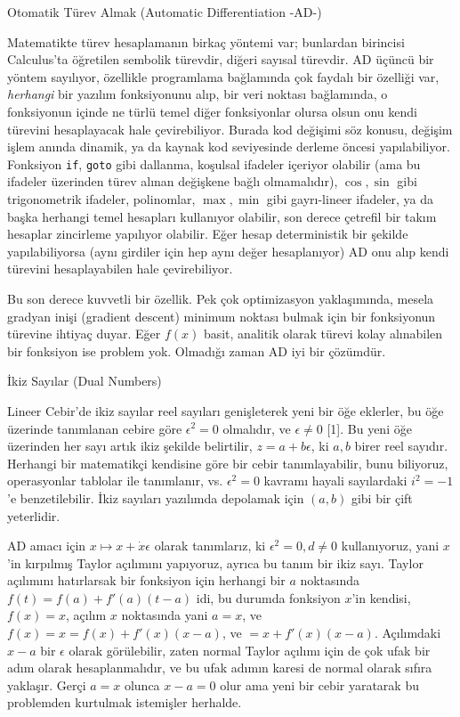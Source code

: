 \documentclass[12pt,fleqn]{article}\usepackage{../../common}
\begin{document}
Otomatik Türev Almak (Automatic Differentiation -AD-)

Matematikte türev hesaplamanın birkaç yöntemi var; bunlardan birincisi
Calculus'ta öğretilen sembolik türevdir, diğeri sayısal türevdir. AD üçüncü
bir yöntem sayılıyor, özellikle programlama bağlamında çok faydalı bir
özelliği var, {\em herhangi} bir yazılım fonksiyonunu alıp, bir veri
noktası bağlamında, o fonksiyonun içinde ne türlü temel diğer fonksiyonlar
olursa olsun onu kendi türevini hesaplayacak hale çevirebiliyor. Burada kod
değişimi söz konusu, değişim işlem anında dinamik, ya da kaynak kod
seviyesinde derleme öncesi yapılabiliyor. Fonksiyon \verb!if!, \verb!goto!
gibi dallanma, koşulsal ifadeler içeriyor olabilir (ama bu ifadeler
üzerinden türev alınan değişkene bağlı olmamalıdır), $\cos,\sin$ gibi
trigonometrik ifadeler, polinomlar, $\max,\min$ gibi gayrı-lineer ifadeler,
ya da başka herhangi temel hesapları kullanıyor olabilir, son derece
çetrefil bir takım hesaplar zincirleme yapılıyor olabilir. Eğer hesap
deterministik bir şekilde yapılabiliyorsa (aynı girdiler için hep aynı
değer hesaplanıyor) AD onu alıp kendi türevini hesaplayabilen hale
çevirebiliyor.

Bu son derece kuvvetli bir özellik. Pek çok optimizasyon yaklaşımında,
mesela gradyan inişi (gradient descent) minimum noktası bulmak için bir
fonksiyonun türevine ihtiyaç duyar. Eğer $f(x)$ basit, analitik olarak
türevi kolay alınabilen bir fonksiyon ise problem yok. Olmadığı zaman AD
iyi bir çözümdür.

İkiz Sayılar (Dual Numbers)

Lineer Cebir'de ikiz sayılar reel sayıları genişleterek yeni bir öğe
eklerler, bu öğe üzerinde tanımlanan cebire göre $\epsilon^2 = 0$
olmalıdır, ve $\epsilon \ne 0$ [1]. Bu yeni öğe üzerinden her sayı artık
ikiz şekilde belirtilir, $z = a + b\epsilon$, ki $a,b$ birer reel
sayıdır. Herhangi bir matematikçi kendisine göre bir cebir tanımlayabilir,
bunu biliyoruz, operasyonlar tablolar ile tanımlanır, vs.  $\epsilon^2=0$
kavramı hayali sayılardaki $i^2 = -1$'e benzetilebilir. İkiz sayıları
yazılımda depolamak için $(a,b)$ gibi bir çift yeterlidir.

AD amacı için $x \mapsto x + \dot{x} \epsilon$ olarak tanımlarız, ki
$\epsilon^2 = 0, d \ne 0$ kullanıyoruz, yani $x$'in kırpılmış Taylor
açılımını yapıyoruz, ayrıca bu tanım bir ikiz sayı. Taylor açılımını
hatırlarsak bir fonksiyon için herhangi bir $a$ noktasında
$f(t) = f(a) + f'(a)(t-a)$ idi, bu durumda fonksiyon $x$'in kendisi,
$f(x)=x$, açılım $x$ noktasında yani $a=x$, ve $f(x)=x=f(x)+f'(x)(x-a)$, ve
$=x+f'(x)(x-a)$. Açılımdaki $x-a$ bir $\epsilon$ olarak görülebilir, zaten
normal Taylor açılımı için de çok ufak bir adım olarak hesaplanmalıdır, ve
bu ufak adımın karesi de normal olarak sıfıra yaklaşır. Gerçi $a=x$ olunca
$x-a=0$ olur ama yeni bir cebir yaratarak bu problemden kurtulmak
istemişler herhalde.
\end{document}
